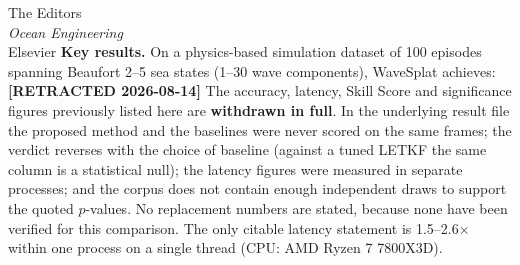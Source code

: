 \documentclass[11pt, a4paper]{letter}
\begin{document}
\begin{letter}{%
The Editors\\
\textit{Ocean Engineering}\\
Elsevier
}
\textbf{Key results.}
On a physics-based simulation dataset of 100 episodes spanning Beaufort 2--5
sea states (1--30 wave components), WaveSplat achieves:
\textbf{[RETRACTED 2026-08-14]} The accuracy, latency, Skill Score and
significance figures previously listed here are \textbf{withdrawn in full}.
In the underlying result file the proposed method and the baselines were never
scored on the same frames; the verdict reverses with the choice of baseline
(against a tuned LETKF the same column is a statistical null); the latency
figures were measured in separate processes; and the corpus does not contain
enough independent draws to support the quoted $p$-values.
No replacement numbers are stated, because none have been verified for this
comparison. The only citable latency statement is 1.5--2.6$\times$ within one
process on a single thread (CPU: AMD Ryzen 7 7800X3D).


\end{letter}
\end{document}

